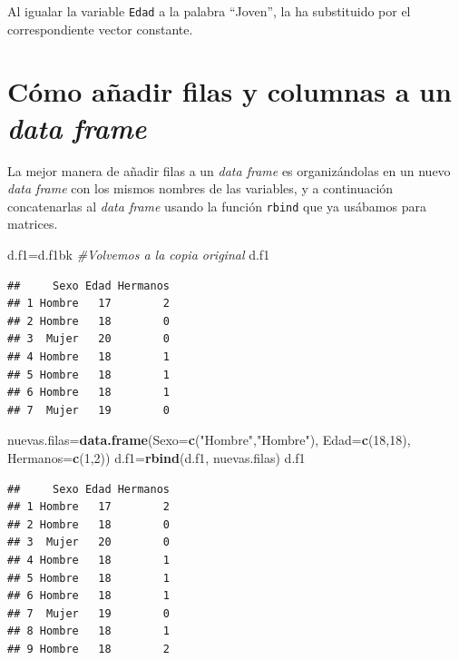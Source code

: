 \documentclass[]{book}
\newenvironment{Shaded}{\begin{snugshade}}{\end{snugshade}}
\newcommand{\CommentTok}[1]{\textcolor[rgb]{0.56,0.35,0.01}{\textit{#1}}}
\newcommand{\DataTypeTok}[1]{\textcolor[rgb]{0.13,0.29,0.53}{#1}}
\newcommand{\DecValTok}[1]{\textcolor[rgb]{0.00,0.00,0.81}{#1}}
\newcommand{\KeywordTok}[1]{\textcolor[rgb]{0.13,0.29,0.53}{\textbf{#1}}}
\newcommand{\NormalTok}[1]{#1}
\newcommand{\StringTok}[1]{\textcolor[rgb]{0.31,0.60,0.02}{#1}}
\theoremstyle{definition}
\theoremstyle{definition}
\theoremstyle{definition}
\theoremstyle{remark}
\begin{document}
Al igualar la variable \texttt{Edad} a la palabra ``Joven'', la ha substituido por el correspondiente vector constante.

\hypertarget{sec:dfaf}{%
\section{\texorpdfstring{Cómo añadir filas y columnas a un \emph{data frame}}{Cómo añadir filas y columnas a un data frame}}\label{sec:dfaf}}

La mejor manera de añadir filas a un \emph{data frame} es organizándolas en un nuevo \emph{data frame} con los mismos nombres de las variables, y a continuación concatenarlas al \emph{data frame} usando la función \texttt{rbind} que ya usábamos para matrices.

\begin{Shaded}
\begin{Highlighting}[]
\NormalTok{d.f1=d.f1bk  }\CommentTok{#Volvemos a la copia original}
\NormalTok{d.f1}
\end{Highlighting}
\end{Shaded}

\begin{verbatim}
##     Sexo Edad Hermanos
## 1 Hombre   17        2
## 2 Hombre   18        0
## 3  Mujer   20        0
## 4 Hombre   18        1
## 5 Hombre   18        1
## 6 Hombre   18        1
## 7  Mujer   19        0
\end{verbatim}

\begin{Shaded}
\begin{Highlighting}[]
\NormalTok{nuevas.filas=}\KeywordTok{data.frame}\NormalTok{(}\DataTypeTok{Sexo=}\KeywordTok{c}\NormalTok{(}\StringTok{"Hombre"}\NormalTok{,}\StringTok{"Hombre"}\NormalTok{), }\DataTypeTok{Edad=}\KeywordTok{c}\NormalTok{(}\DecValTok{18}\NormalTok{,}\DecValTok{18}\NormalTok{), }\DataTypeTok{Hermanos=}\KeywordTok{c}\NormalTok{(}\DecValTok{1}\NormalTok{,}\DecValTok{2}\NormalTok{))}
\NormalTok{d.f1=}\KeywordTok{rbind}\NormalTok{(d.f1, nuevas.filas)}
\NormalTok{d.f1}
\end{Highlighting}
\end{Shaded}

\begin{verbatim}
##     Sexo Edad Hermanos
## 1 Hombre   17        2
## 2 Hombre   18        0
## 3  Mujer   20        0
## 4 Hombre   18        1
## 5 Hombre   18        1
## 6 Hombre   18        1
## 7  Mujer   19        0
## 8 Hombre   18        1
## 9 Hombre   18        2
\end{verbatim}
\end{document}
